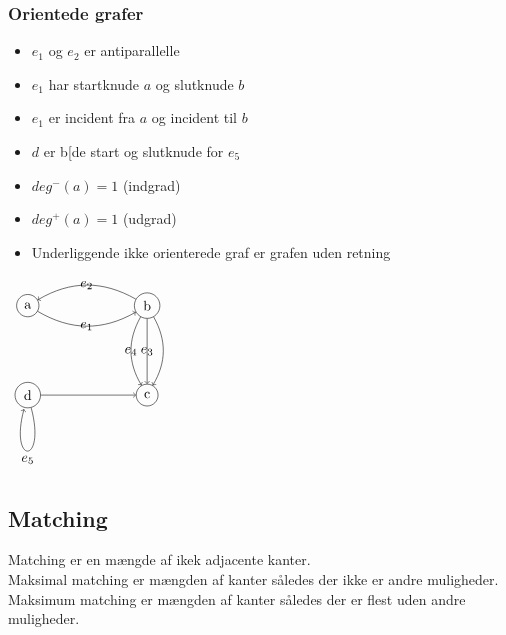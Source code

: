 \documentclass[12pt, a4paper]{article}
\begin{document}
			\subsubsection{Orientede grafer}
				\begin{minipage}{0.55\textwidth}
					\begin{itemize}
						\item $e_1$ og $e_2$ er antiparallelle\\
						\item $e_1$ har startknude $a$ og slutknude $b$\\
						\item $e_1$ er incident fra $a$ og incident til $b$\\
						\item $d$ er b[de start og slutknude for $e_5$\\
						\item $deg^-(a)=1$ (indgrad)\\
						\item $deg^+(a)=1$ (udgrad)
						\item Underliggende ikke orienterede graf er grafen uden retning
					\end{itemize}
				\end{minipage}
				\hfill
				\begin{minipage}{0.35\textwidth}
					$\begin{tikzpicture}[scale=3]
						\tikzstyle{vertex}=[circle,draw=black]
						\node[vertex](v1) at (0,0.75) {a};
						\node[vertex](v2) at (1,0.75) {b};
						\node[vertex](v3) at (1,0) {c};
						\node[vertex](v4) at (0,0) {d};
						\path[->]
							(v1) edge[bend right] node {$e_1$} (v2)
							(v2) edge[bend right] node {$e_2$} (v1)
							(v2) edge[] node {$e_3$} (v3)
							(v2) edge[bend left] node {} (v3)
							(v2) edge[bend right] node {$e_4$} (v3)
							(v4) edge[] node {} (v3)
							(v4) edge[loop below] node {$e_5$} (v4);
					\end{tikzpicture}$
				\end{minipage}
		\subsection{Matching}
			Matching er en mængde af ikek adjacente kanter.\\
			Maksimal matching er mængden af kanter således der ikke er andre muligheder.\\
			Maksimum matching er mængden af kanter således der er flest uden andre muligheder.\\
\end{document}
